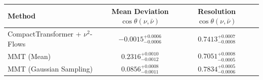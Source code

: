     \begin{tabular}{lccc}
        \toprule
        Method & Mean Deviation $\cos\theta(\nu, \bar{\nu})$ & Resolution $\cos\theta(\nu, \bar{\nu})$ \\
        \midrule
        CompactTransformer + $\nu^2$-Flows & $-0.0015^{+0.0006}_{-0.0006}$ & $0.7413^{+0.0007}_{-0.0008}$ \\
        MMT (Mean) & $0.2316^{+0.0010}_{-0.0012}$ & $0.7051^{+0.0008}_{-0.0005}$ \\
        MMT (Gaussian Sampling) & $0.0856^{+0.0008}_{-0.0011}$ & $0.7834^{+0.0005}_{-0.0006}$ \\
        \bottomrule
    \end{tabular}